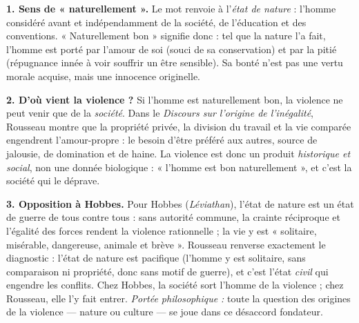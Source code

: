 \documentclass[11pt]{article}
\begin{document}
\begin{corrige}

\textbf{1. Sens de « naturellement ».} Le mot renvoie à l'\emph{état de nature} : l'homme considéré avant et indépendamment de la société, de l'éducation et des conventions. « Naturellement bon » signifie donc : tel que la nature l'a fait, l'homme est porté par l'amour de soi (souci de sa conservation) et par la pitié (répugnance innée à voir souffrir un être sensible). Sa bonté n'est pas une vertu morale acquise, mais une innocence originelle.

\textbf{2. D'où vient la violence ?} Si l'homme est naturellement bon, la violence ne peut venir que de la \emph{société}. Dans le \emph{Discours sur l'origine de l'inégalité}, Rousseau montre que la propriété privée, la division du travail et la vie comparée engendrent l'amour-propre : le besoin d'être préféré aux autres, source de jalousie, de domination et de haine. La violence est donc un produit \emph{historique et social}, non une donnée biologique : « l'homme est bon naturellement », et c'est la société qui le déprave.

\textbf{3. Opposition à Hobbes.} Pour Hobbes (\emph{Léviathan}), l'état de nature est un état de guerre de tous contre tous : sans autorité commune, la crainte réciproque et l'égalité des forces rendent la violence rationnelle ; la vie y est « solitaire, misérable, dangereuse, animale et brève ». Rousseau renverse exactement le diagnostic : l'état de nature est pacifique (l'homme y est solitaire, sans comparaison ni propriété, donc sans motif de guerre), et c'est l'état \emph{civil} qui engendre les conflits. Chez Hobbes, la société sort l'homme de la violence ; chez Rousseau, elle l'y fait entrer. \emph{Portée philosophique :} toute la question des origines de la violence — nature ou culture — se joue dans ce désaccord fondateur.

\end{corrige}
\end{document}
